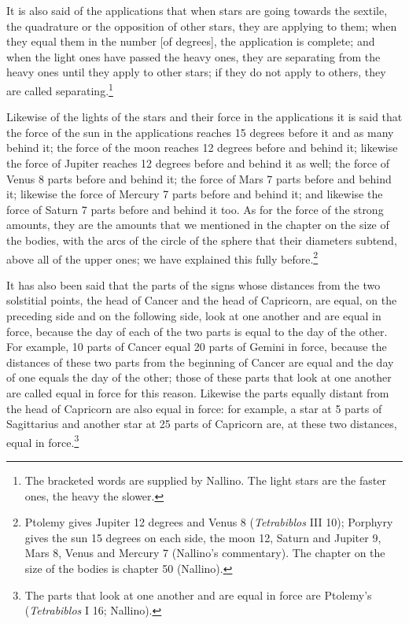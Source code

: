 \documentclass[11pt]{article}
\newcommand{\ArPage}[1]{\marginpar{\footnotesize\color{gray}Ar.\,p.\,#1}}
\begin{document}
\par \ArPage{195}It is also said of the applications that when stars are going towards the sextile, the quadrature or the opposition of other stars, they are applying to them; when they equal them in the number [of degrees], the application is complete; and when the light ones have passed the heavy ones, they are separating from the heavy ones until they apply to other stars; if they do not apply to others, they are called separating.\footnote{The bracketed words are supplied by Nallino. The light stars are the faster ones, the heavy the slower.}\par
\par Likewise of the lights of the stars and their force in the applications it is said that the force of the sun in the applications reaches 15 degrees before it and as many behind it; the force of the moon reaches 12 degrees before and behind it; likewise the force of Jupiter reaches 12 degrees before and behind it as well; the force of Venus 8 parts before and behind it; the force of Mars 7 parts before and behind it; likewise the force of Mercury 7 parts before and behind it; and likewise the force of Saturn 7 parts before and behind it too. As for the force of the strong amounts, they are the amounts that we mentioned in the chapter on the size of the bodies, with the arcs of the circle of the sphere that their diameters subtend, above all of the upper ones; we have explained this fully before.\footnote{Ptolemy gives Jupiter 12 degrees and Venus 8 (\emph{Tetrabiblos} III 10); Porphyry gives the sun 15 degrees on each side, the moon 12, Saturn and Jupiter 9, Mars 8, Venus and Mercury 7 (Nallino's commentary). The chapter on the size of the bodies is chapter 50 (Nallino).}\par
\par It has also been said that the parts of the signs whose distances from the two solstitial points, the head of Cancer and the head of Capricorn, are equal, on the preceding side and on the following side, look at one another and are equal in force, because the day of each of the two parts is equal to the day of the other. For example, 10 parts of Cancer equal 20 parts of Gemini in force, because the distances of these two parts from the beginning of Cancer are equal and the day of one equals the day of the other; those of these parts that look at one another are called equal in force for this reason. Likewise the parts equally distant from the head of Capricorn are also equal in force: for example, a star at 5 parts of Sagittarius and another star at 25 parts of Capricorn are, at these two distances, equal in force.\footnote{The parts that look at one another and are equal in force are Ptolemy's (\emph{Tetrabiblos} I 16; Nallino).}\par
\end{document}
